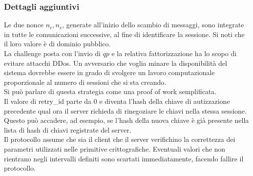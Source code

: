 

\subsubsection{Dettagli aggiuntivi}
Le due nonce $n_c, n_s$, generate all'inizio dello scambio di messaggi, sono integrate in tutte le comunicazioni successive,
al fine di identificare la sessione.
Si noti che il loro valore è di dominio pubblico. \\

La challenge posta con l'invio di $qp$ e la relativa fattorizzazione ha lo scopo di evitare attacchi DDos.
Un avversario che voglia minare la disponibilità del sistema dovrebbe essere in grado di svolgere un lavoro computazionale
proporzionale al numero di sessioni che si sta creando. \\
Si può parlare di questa strategia come una proof of work semplificata. \\

Il valore di retry\_id parte da 0 e diventa l'hash della chiave di autizzazione precedente qual ora il server
richieda di rinegoziare le chiavi nella stessa sessione.
Questo può accadere, ad esempio, se l'hash della nuova chiave è già presente nella lista di hash di chiavi registrate del server. \\

Il protocollo assume che sia il client che il server verifichino la correttezza dei parametri utilizzati nelle primitive crittografiche.
Eventuali valori che non rientrano negli intervalli definiti sono scartati immediatamente, facendo fallire il protocollo.

